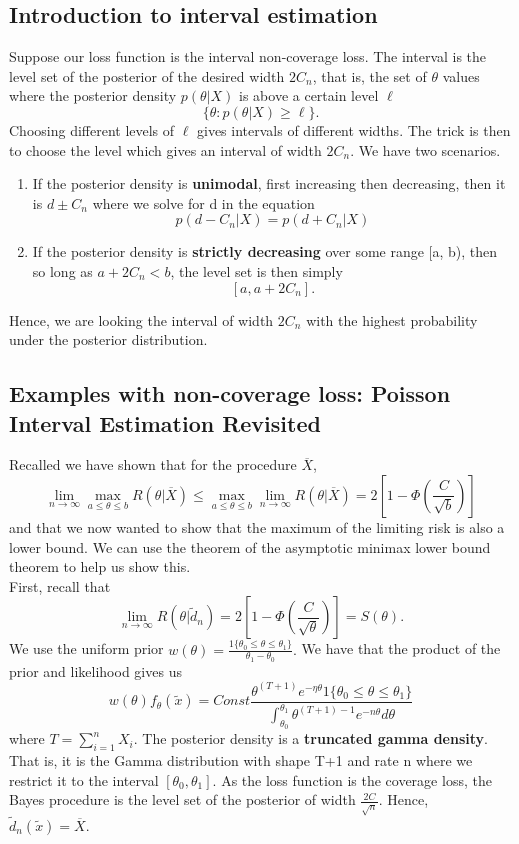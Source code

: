 \documentclass[twoside]{article}
\begin{document}
\subsection{Introduction to interval estimation}
Suppose our loss function is the interval non-coverage loss. The interval is the level set of the posterior of the desired width $2C_n$, that is, the set of $\theta$ values where the posterior density $p(\theta|X)$ is above a certain level $\ell$
$$
\{\theta: p(\theta|X) \geq \ell\}.
$$
Choosing different levels of $\ell$ gives intervals of different widths. The trick is then to choose the level which gives an interval of width $2C_n.$ We have two scenarios.
\begin{enumerate} 
\item If the posterior density is \textbf{unimodal}, first increasing then decreasing, then it is $d \pm C_n$ where we solve for d in the equation
$$
p(d - C_n|X) = p(d + C_n|X)
$$
\item If the posterior density is \textbf{strictly decreasing} over some range [a, b), then so long as $a + 2C_n < b$, the level set is then simply 
$$
[a, a + 2C_n].
$$
\end{enumerate}

Hence, we are looking the interval of width $2C_n$ with the highest probability under the posterior distribution.
\subsection{Examples with non-coverage loss: Poisson Interval Estimation Revisited}
Recalled we have shown that for the procedure $\overline{X}$,
$$
\lim_{n\rightarrow \infty}\max_{a \leq \theta \leq b}R(\theta|\overline{X}) \leq \max_{a \leq \theta \leq b}\lim_{n\rightarrow \infty}R(\theta|\overline{X}) = 2[1 - \Phi(\frac{C}{\sqrt{b}})]
$$
and that we now wanted to show that the maximum of the limiting risk is also a lower bound. We can use the theorem of the asymptotic minimax lower bound theorem to help us show this.\\

First, recall that 
$$
\lim_{n \rightarrow \infty}R(\theta|\tilde{d}_n) = 2 [1 - \Phi(\frac{C}{\sqrt{\theta}})] = S(\theta).
$$
We use the uniform prior $w(\theta) = \frac{1\{\theta_0 \leq \theta \leq \theta_1\}}{\theta_1 - \theta_0}.$ We have that the product of the prior and likelihood gives us 
$$
w(\theta)f_{\theta}(\tilde{x}) = Const \frac{\theta^{(T+1)}e^{-\eta \theta}1\{\theta_0 \leq \theta \leq \theta_1\}}{\int_{\theta_0}^{\theta_1}\theta^{(T+1)-1}e^{-n\theta}d\theta}
$$
where $T = \sum_{i=1}^{n}X_i.$ The posterior density is a \textbf{truncated gamma density}. That is, it is the Gamma distribution with shape T+1 and rate n where we restrict it to the interval $[\theta_0,\theta_1].$ As the loss function is the coverage loss, the Bayes procedure is the level set of the posterior of width $\frac{2C}{\sqrt{n}}.$ Hence, $\tilde{d}_n(\tilde{x}) = \overline{X}.$\\
\end{document}
